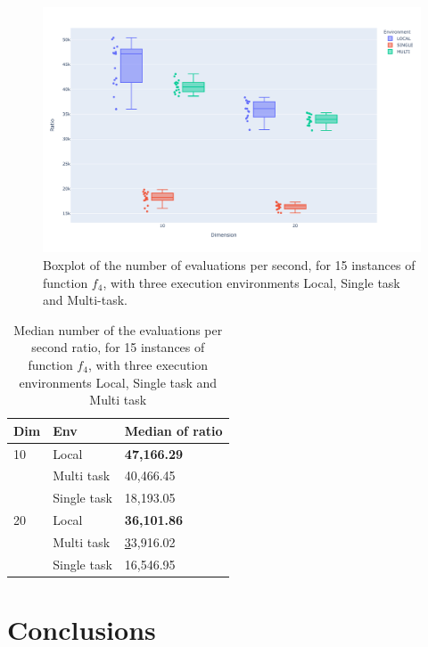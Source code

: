 \documentclass[review]{elsarticle}
\begin{document}
\begin{figure}[h!tbp]
  \centering
  \includegraphics[width=\textwidth]{aws}
  \caption{Boxplot of the number of evaluations per second, for 15 instances of function $f_4$,
   with three execution environments Local, Single task and Multi-task.
   }
  \label{fig:aws-results}
\end{figure}
%
\begin{table}[h!tbp]
  \small
  \caption{ Median number of the evaluations per second ratio, for 15 instances of function $f_4$,
  with three execution environments Local, Single task and Multi task}
  \label{tab:aws}
  \vspace{0.25cm}
  \centering

  \begin{tabular}{lll}
  \hline
  Dim & Env         & Median of ratio \\
  \hline
  10  & Local       & \textbf{47,166.29}       \\
      & Multi task  & 40,466.45    \\
      & Single task & 18,193.05      \\
  \hline
  20  & Local       & \textbf{36,101.86}   \\
      & Multi task  & {\ul 33,916.02}       \\
      & Single task & 16,546.95  \\
  \hline
  \end{tabular}
\end{table}




\section{Conclusions} 
\label{conclusions}
\end{document}
